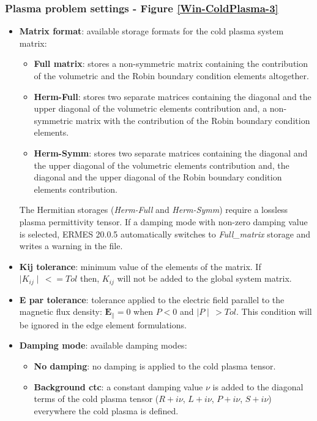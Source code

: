 \subsubsection{Plasma problem settings - Figure \ref{Win-ColdPlasma-3}}\label{ColdPlasmaSettings}
\vspace{0.75em}
\begin{itemize}\itemsep1em 
	\item \textbf{Matrix format}: available storage formats for the cold plasma system matrix:
	\begin{itemize}\itemsep0.75em 
		\item \textbf{Full matrix}: stores a non-symmetric matrix containing the contribution of the volumetric and the Robin boundary condition elements altogether.
		\quad
		\item \textbf{Herm-Full}: stores two separate matrices containing the diagonal and the upper diagonal of the volumetric elements contribution and, a non-symmetric matrix with the contribution of the Robin boundary condition elements.
		\quad
		\item \textbf{Herm-Symm}: stores two separate matrices containing the diagonal and the upper diagonal of the volumetric elements contribution and, the diagonal and the upper diagonal of the Robin boundary condition elements contribution.
	\end{itemize}
	The Hermitian storages (\textit{Herm-Full} and \textit{Herm-Symm}) require a lossless plasma permittivity tensor. If a damping mode with non-zero damping value is selected, ERMES 20.0.5 automatically switches to \textit{Full\_matrix} storage and writes a warning in the  file.
	\item \textbf{Kij tolerance}: minimum value of the elements of the matrix. If $\mid K_{ij} \mid\, <= Tol$ then, $K_{ij}$ will not be added to the global system matrix.
	\item \textbf{E par tolerance}: tolerance applied to the electric field parallel to the magnetic flux density: $\textbf{E}_{\parallel} = 0$ when $P < 0$ and $\mid P \mid\, > Tol$. This condition will be ignored in the edge element formulations. 
	\item \textbf{Damping mode}: available damping modes:
	\begin{itemize}\itemsep0.5em 
	    \item \textbf{No damping}: no damping is applied to the cold plasma tensor.
        \quad
	    \item \textbf{Background ctc}: a constant damping value $\nu$ is added to the diagonal terms of the cold plasma tensor ($R + i\nu$, $L + i\nu$, $P + i\nu$, $S + i\nu$) everywhere the cold plasma is defined.

\end{itemize}
\end{itemize}
